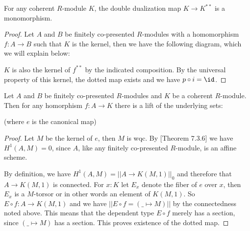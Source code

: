 \begin{lemma}
  For any coherent $R$-module $K$, the double dualization map $K\to K^{\ast\ast}$ is a monomorphism.
\end{lemma}

\begin{proof}
  Let $A$ and $B$ be finitely co-presented $R$-modules with a homomorphism $f:A\to B$ such that $K$ is the kernel, then we have the following diagram, which we will explain below:
\begin{center}
\end{center}
$K$ is also the kernel of $f^{\ast\ast}$ by the indicated composition.
By the universal property of this kernel, the dotted map exists and we have $p\circ i=\id$.
\end{proof}

\begin{lemma}
  Let $A$ and $B$ be finitely co-presented $R$-modules and $K$ be a coherent $R$-module.
  Then for any homorphism $f:A\to K$ there is a lift of the underlying sets:
  \begin{center}
  \end{center}
  (where $e$ is the canonical map)
\end{lemma}

\begin{proof}
  Let $M$ be the kernel of $e$, then $M$ is wqc.
  By \cite{draft}[Theorem 7.3.6] we have $H^1(A,M)=0$, since $A$, like any finitely co-presented $R$-module, is an affine scheme.

  By definition, we have $H^1(A,M)=||A\to K(M,1)||_0$ and therefore that $A\to K(M,1)$ is connected.
  For $x:K$ let $E_x$ denote the fiber of $e$ over $x$, then $E_x$ is a $M$-torsor or in other words an element of $K(M,1)$.
  So $E\circ f:A\to K(M,1)$ and we have $|| E\circ f = (\_\mapsto M) ||$ by the connectedness noted above.
  This means that the dependent type $E\circ f$ merely has a section, since $(\_\mapsto M)$ has a section.
  This proves existence of the dotted map.
\end{proof}

